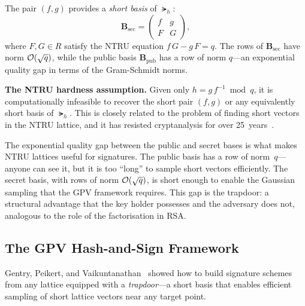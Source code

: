 The pair $(f, g)$ provides a \emph{short basis} of $\lat_h$:
\begin{equation}
\label{eq:ntru-short-basis}
\mathbf{B}_{\mathrm{sec}} = \begin{pmatrix} f & g \\ F & G \end{pmatrix},
\end{equation}
where $F, G \in R$ satisfy the NTRU equation $f\,G - g\,F = q$.  The rows of $\mathbf{B}_{\mathrm{sec}}$ have norm $\mathcal{O}(\sqrt{q})$, while the public basis $\mathbf{B}_{\mathrm{pub}}$ has a row of norm $q$---an exponential quality gap in terms of the Gram-Schmidt norms.

\begin{svgraybox}
\textbf{The NTRU hardness assumption.}  Given only $h = g\,f^{-1} \bmod q$, it is computationally infeasible to recover the short pair $(f, g)$ or any equivalently short basis of $\lat_h$.  This is closely related to the problem of finding short vectors in the NTRU lattice, and it has resisted cryptanalysis for over 25~years~\cite{NTRU1998}.
\end{svgraybox}

The exponential quality gap between the public and secret bases is what makes NTRU lattices useful for signatures.  The public basis has a row of norm~$q$---anyone can see it, but it is too ``long'' to sample short vectors efficiently.  The secret basis, with rows of norm $\mathcal{O}(\sqrt{q})$, is short enough to enable the Gaussian sampling that the GPV framework requires.  This gap is the trapdoor: a structural advantage that the key holder possesses and the adversary does not, analogous to the role of the factorisation in RSA.

\subsection{The GPV Hash-and-Sign Framework}
\label{subsec:gpv-framework}

Gentry, Peikert, and Vaikuntanathan~\cite{GPV2008} showed how to build signature schemes from any lattice equipped with a \emph{trapdoor}---a short basis that enables efficient sampling of short lattice vectors near any target point.

